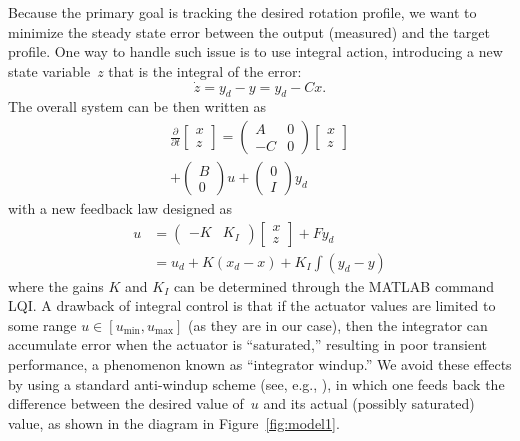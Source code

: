 \documentclass{iopart}
\begin{document}
Because the primary goal is tracking the desired rotation profile, we want to minimize the steady state error between the output (measured) and the target profile. One way to handle such issue is to use integral action, introducing a new state variable~$z$ that is the integral of the error:
\begin{equation}
	\dot{z} = y_{d} - y = y_{d} - C x.
	\label{integral}
\end{equation}
The overall system can be then written as
\begin{multline}
\frac{\partial}{\partial t}   \left[\! \begin{array}{c}  x \\ z \end{array}\!\right]
  ={ \left(\! \begin{array}{cc} A  & 0 \\ -C & 0 \end{array} \! \right)} \left[\! \begin{array}{c} x \\ z    \end{array}  \!\right] \\
  + \left(\! \begin{array}{c} B   \\ 0    \end{array}  \!\right) u + \left(\! \begin{array}{c}  0 \\ I \end{array}\!\right) y_{d}
\label{int2}
\end{multline}
with a new feedback law designed as
\begin{align}
u &= \left(\! \begin{array}{cc}  -K & K_I\end{array}\!\right) \left[\! \begin{array}{c}  x \\ z \end{array}\!\right] + F y_{d} \\
   &= u_d + K (x_d - x) + K_I \!\!\int (y_d - y)
\end{align}
where the gains $K$ and $K_I$ can be determined through the MATLAB command LQI.
A drawback of integral control is that if the actuator values are limited to some range $u\in[u_\text{min},u_\text{max}]$ (as they are in our case), then the integrator can accumulate error when the actuator is ``saturated,'' resulting in poor transient performance, a phenomenon known as ``integrator windup.''  We avoid these effects by using a standard anti-windup scheme (see, e.g., \cite{AandM, Lewis}), in which one feeds back the difference between the desired value of~$u$ and its actual (possibly saturated) value, as shown in the diagram in Figure~\ref{fig:model1}.  
\end{document}
